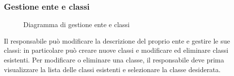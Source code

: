 \documentclass[a4paper, titlepage]{article}
\begin{document}
\subsubsection{Gestione ente e classi} 
\begin{figure}[H]
	\centering
	\noindent{}
	\caption{Diagramma di gestione ente e classi}
\end{figure}
Il responsabile può modificare la descrizione del proprio ente e gestire le sue classi: in particolare può creare nuove classi e modificare ed eliminare classi esistenti. Per modificare o eliminare una classe, il responsabile deve prima visualizzare la lista delle classi esistenti e selezionare la classe desiderata. 
\end{document}
